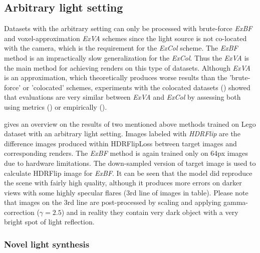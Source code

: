 \subsection{Arbitrary light setting}

Datasets with the arbitrary setting can only be processed with 
brute-force \textit{ExBF} and voxel-approximation \textit{ExVA} schemes
since the light source is not co-located with the camera,
which is the requirement for the \textit{ExCol} scheme.
The \textit{ExBF} method is an impractically slow generalization for the \textit{ExCol}.
Thus the \textit{ExVA} is the main method for achieving renders on this type of datasets.
Although \textit{ExVA} is an approximation,
which theoretically produces worse results than the 'brute-force' or 'colocated' schemes,
experiments with the colocated datasets () showed
that evaluations are very similar between \textit{ExVA} and \textit{ExCol}
by assessing both using metrics () or empirically ().

 gives an overview on the results of two mentioned above methods
trained on Lego dataset with an arbitrary light setting.
Images labeled with \textit{HDRFlip} are the difference images produced within HDRFlipLoss \cite{andersson2020flip, theisel2021hdrflip}
between target images and corresponding renders.
The \textit{ExBF} method is again trained only on 64px images due to hardware limitations.
The down-sampled version of target image is used to calculate HDRFlip image for \textit{ExBF}.
It can be seen that the model did reproduce the scene with fairly high quality,
although it produces more errors on darker views with some highly specular flares (3rd line of images in table).
Please note that images on the 3rd line are post-processed by scaling and applying gamma-correction ($\gamma = 2.5$)
and in reality they contain very dark object with a very bright spot of light reflection.


\subsubsection{Novel light synthesis}


